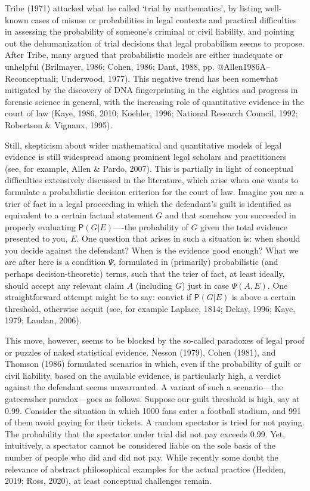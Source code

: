\documentclass[11pt,dvipsnames,enabledeprecatedfontcommands]{scrartcl}
\newcommand{\pr}[1]{\mathsf{P}(#1)}
\begin{document}
Tribe (1971) attacked what he called `trial by mathematics', by listing
well-known cases of misuse or probabilities in legal contexts and
practical difficulties in assessing the probability of someone's
criminal or civil liability, and pointing out the dehumanization of
trial decisions that legal probabilism seems to propose. After Tribe,
many argued that probabilistic models are either inadequate or unhelpful
(Brilmayer, 1986; Cohen, 1986; Dant, 1988, pp.
@Allen1986A--Reconceptuali; Underwood, 1977). This negative trend has
been somewhat mitigated by the discovery of DNA fingerprinting in the
eighties and progress in forensic science in general, with the
increasing role of quantitative evidence in the court of law (Kaye,
1986, 2010; Koehler, 1996; National Research Council, 1992; Robertson \&
Vignaux, 1995).

Still, skepticism about wider mathematical and quantitative models of
legal evidence is still widespread among prominent legal scholars and
practitioners (see, for example, Allen \& Pardo, 2007). This is
partially in light of conceptual difficulties extensively discussed in
the literature, which arise when one wants to formulate a probabilistic
decision criterion for the court of law. Imagine you are a trier of fact
in a legal proceeding in which the defendant's guilt is identified as
equivalent to a certain factual statement \(G\) and that somehow you
succeeded in properly evaluating \(\pr{G\vert E}\)----the probability of
\(G\) given the total evidence presented to you, \(E\). One question
that arises in such a situation is: when should you decide against the
defendant? When is the evidence good enough? What we are after here is a
condition \(\Psi\), formulated in (primarily) probabilistic (and perhaps
decision-theoretic) terms, such that the trier of fact, at least
ideally, should accept any relevant claim \(A\) (including \(G\)) just
in case \(\Psi(A, E)\). One straightforward attempt might be to say:
convict if \(\pr{G\vert E}\) is above a certain threshold, otherwise
acquit (see, for example Laplace, 1814; Dekay, 1996; Kaye, 1979; Laudan,
2006).

This move, however, seems to be blocked by the so-called paradoxes of
legal proof or puzzles of naked statistical evidence. Nesson (1979),
Cohen (1981), and Thomson (1986) formulated scenarios in which, even if
the probability of guilt or civil liability, based on the available
evidence, is particularly high, a verdict against the defendant seems
unwarranted. A variant of such a scenario---the gatecrasher
paradox---goes as follows. Suppose our guilt threshold is high, say at
0.99. Consider the situation in which 1000 fans enter a football
stadium, and 991 of them avoid paying for their tickets. A random
spectator is tried for not paying. The probability that the spectator
under trial did not pay exceeds 0.99. Yet, intuitively, a spectator
cannot be considered liable on the sole basis of the number of people
who did and did not pay. While recently some doubt the relevance of
abstract philosophical examples for the actual practice (Hedden, 2019;
Ross, 2020), at least conceptual challenges remain.
\end{document}
